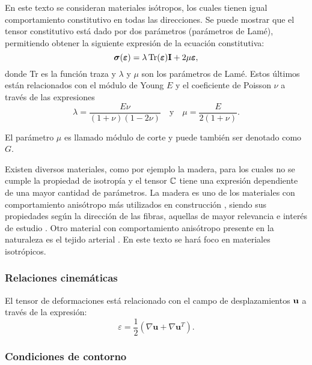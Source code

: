 En este texto se consideran materiales isótropos, los cuales tienen igual comportamiento constitutivo en todas las direcciones. %
%
Se puede mostrar que el tensor constitutivo está dado por dos parámetros (parámetros de Lamé), permitiendo obtener la siguiente expresión de la ecuación constitutiva:
%
\begin{equation}\label{eqn:eccons}
\boldsymbol{\sigma} (\boldsymbol{\varepsilon}) = \lambda \operatorname{\text{Tr}} (\boldsymbol{\varepsilon}) {\bf I} + 2 \mu \boldsymbol{\varepsilon},
\end{equation}
%
donde Tr es la función traza y $\lambda$ y $\mu$ son los parámetros de Lamé. %
%
Estos últimos están relacionados con el módulo de Young $E$ y el coeficiente de Poisson $\nu$ a través de las expresiones
%
\begin{equation}\label{eqn:lamePars}
 \lambda = \frac{E \nu}{(1+\nu)(1-2 \nu)} \quad \text{y} \quad
 \mu = \frac{E}{2(1+\nu)}.
\end{equation}

El parámetro $\mu$ es llamado módulo de corte y puede también ser denotado como $G$.

Existen diversos materiales, como por ejemplo la madera, para los cuales no se cumple la propiedad de isotropía y el tensor ${\mathbb C}$ tiene una expresión dependiente de una mayor cantidad de parámetros. %
%
La madera es uno de los materiales con comportamiento anisótropo más utilizados en construcción \citep{Pereira2014a}, siendo sus propiedades según la dirección de las fibras, aquellas de mayor relevancia e interés de estudio \citep{PerezZerpa2017}. %
%
Otro material con comportamiento anisótropo presente en la naturaleza es el tejido arterial \citep{Holzapfel2000}. %
%
En este texto se hará foco en materiales isotrópicos. %


\subsubsection*{Relaciones cinemáticas}

El tensor de deformaciones está relacionado con el campo de desplazamientos ${\bf u}$ a través de la expresión:
%
\begin{equation}\label{eqn:relcin}
\varepsilon = \frac{1}{2} ( \nabla \textbf{u} + \nabla \textbf{u}^T ).
\end{equation}

\subsubsection*{Condiciones de contorno}

